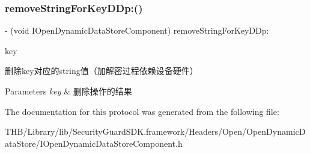\subsubsection{\texorpdfstring{remove\+String\+For\+Key\+D\+Dp\+:()}{removeStringForKeyDDp:()}}
{\footnotesize\ttfamily -\/ (void I\+Open\+Dynamic\+Data\+Store\+Component) remove\+String\+For\+Key\+D\+Dp\+: \begin{DoxyParamCaption}\item[{(N\+S\+String $\ast$)}]{key }\end{DoxyParamCaption}}

删除key对应的string值（加解密过程依赖设备硬件） 
\begin{DoxyParams}{Parameters}
{\em key} & 删除操作的结果 \\
\hline
\end{DoxyParams}


The documentation for this protocol was generated from the following file\+:\begin{DoxyCompactItemize}
\item 
T\+H\+B/\+Library/lib/\+Security\+Guard\+S\+D\+K.\+framework/\+Headers/\+Open/\+Open\+Dynamic\+Data\+Store/I\+Open\+Dynamic\+Data\+Store\+Component.\+h\end{DoxyCompactItemize}
